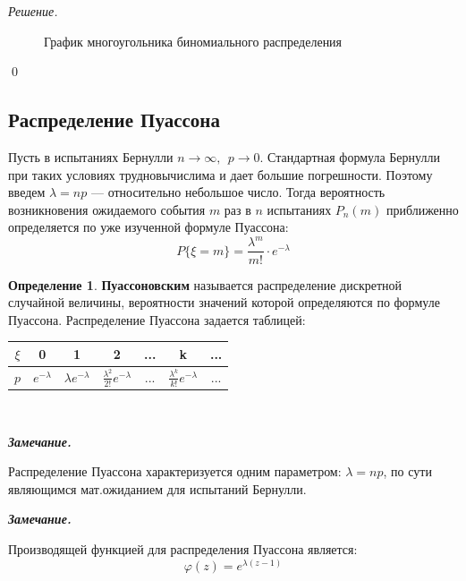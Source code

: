 \documentclass[12pt,a4paper]{article}
\theoremstyle{definition}
\newtheorem{definition}{Определение}[section]
\theoremstyle{definition}
\theoremstyle{remark}
\newenvironment{remark}{
  \par\noindent\textbf{\textit{Замечание.}}~
}{\par}
\theoremstyle{corollary}
\theoremstyle{bolditalic}
\newenvironment{solution}{
    \vspace{0.5em}
    \noindent\textit{Решение.}
}{\qed\vspace{1em}}
\begin{document}
\begin{solution}
\begin{figure}[h!]
        \caption{График многоугольника биномиального распределения}
    \end{figure}
    
\end{solution}

\subsection{Распределение Пуассона}

Пусть в испытаниях Бернулли $n \rightarrow \infty, \ \ p\rightarrow0$. Стандартная формула Бернулли при таких условиях трудновычислима и дает большие погрешности. Поэтому введем $\lambda=np$ --- относительно небольшое число. Тогда вероятность возникновения ожидаемого события $m$ раз в $n$ испытаниях $P_n(m)$ приближенно определяется по уже изученной формуле Пуассона:
\[
P\{\xi=m\}=\frac{\lambda^m}{m!}\cdot e^{-\lambda}
\]

\begin{definition}
 \textbf{Пуассоновским} называется распределение дискретной случайной величины, вероятности значений которой определяются по формуле Пуассона. Распределение Пуассона задается таблицей:\\
 
 \centering
\begin{tabular}{|c|c|c|c|c|c|c|}
\hline
$\xi$ & 0 & 1 & 2 & ... & k & ... \\
\hline
$p$ & $e^{-\lambda}$ & $\lambda e^{-\lambda}$ & $\frac{\lambda^2}{2!} e^{-\lambda}$ & ... & $\frac{\lambda^k}{k!} e^{-\lambda}$ & ... \\
\hline
\end{tabular}\\
\end{definition}

\begin{remark}
 Распределение Пуассона характеризуется одним параметром: $\lambda = np$, по сути являющимся мат.ожиданием для испытаний Бернулли.
\end{remark}
\begin{remark}
 Производящей функцией для распределения Пуассона является:
 \[
 \varphi(z)=e^{\lambda(z-1)}
 \]
\end{remark}
\end{document}
